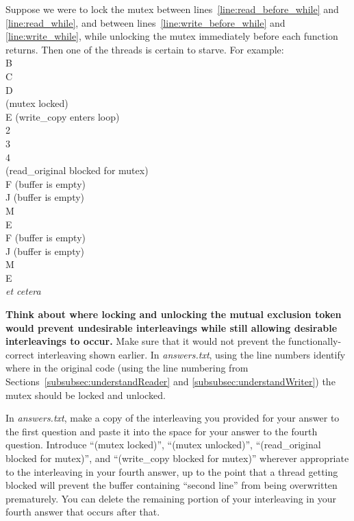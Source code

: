     Suppose we were to lock the mutex between lines~\ref{line:read_before_while} and \ref{line:read_while}, and between lines~\ref{line:write_before_while} and \ref{line:write_while}, while unlocking the mutex immediately before each function returns.
    Then one of the threads is certain to starve.
    For example: \\ {\footnotesize
    \phantom{foobarbaz} B \\
    \phantom{foobarbaz} C \\
    \phantom{foobarbaz} D \\
    \phantom{foobarbaz} (mutex locked) \\
    \phantom{foobarbaz} E   (write\_copy enters loop) \\
    2 \\
    3 \\
    4 \\
    (read\_original blocked for mutex) \\
    \phantom{foobarbaz} F   (buffer is empty) \\
    \phantom{foobarbaz} J   (buffer is empty) \\
    \phantom{foobarbaz} M \\
    \phantom{foobarbaz} E \\
    \phantom{foobarbaz} F   (buffer is empty) \\
    \phantom{foobarbaz} J   (buffer is empty) \\
    \phantom{foobarbaz} M \\
    \phantom{foobarbaz} E \\
    \phantom{foobarbaz} \textit{et cetera}
    }
    \vspace{1cm}

    \textbf{Think about where locking and unlocking the mutual exclusion token would prevent undesirable interleavings while still allowing desirable interleavings to occur.}
    Make sure that it would not prevent the functionally-correct interleaving shown earlier.
    In \textit{answers.txt}, using the line numbers identify where in the original code (using the line numbering from Sections~\ref{subsubsec:understandReader} and \ref{subsubsec:understandWriter}) the mutex should be locked and unlocked.

    In \textit{answers.txt}, make a copy of the interleaving you provided for your answer to the first question and paste it into the space for your answer to the fourth question.
    Introduce ``(mutex locked)'', ``(mutex unlocked)'', ``(read\_original blocked for mutex)'', and ``(write\_copy blocked for mutex)'' wherever appropriate to the interleaving in your fourth answer,
    up to the point that a thread getting blocked will prevent the buffer containing ``second line'' from being overwritten prematurely.
    You can delete the remaining portion of your interleaving in your fourth answer that occurs after that.


